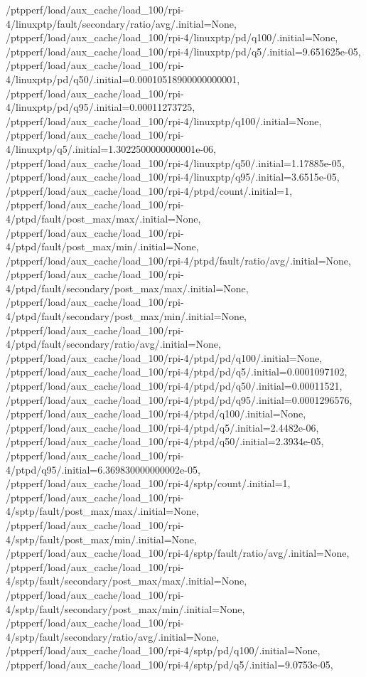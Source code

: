 {    /ptpperf/load/aux_cache/load_100/rpi-4/linuxptp/fault/secondary/ratio/avg/.initial=None,
    /ptpperf/load/aux_cache/load_100/rpi-4/linuxptp/pd/q100/.initial=None,
    /ptpperf/load/aux_cache/load_100/rpi-4/linuxptp/pd/q5/.initial=9.651625e-05,
    /ptpperf/load/aux_cache/load_100/rpi-4/linuxptp/pd/q50/.initial=0.00010518900000000001,
    /ptpperf/load/aux_cache/load_100/rpi-4/linuxptp/pd/q95/.initial=0.00011273725,
    /ptpperf/load/aux_cache/load_100/rpi-4/linuxptp/q100/.initial=None,
    /ptpperf/load/aux_cache/load_100/rpi-4/linuxptp/q5/.initial=1.3022500000000001e-06,
    /ptpperf/load/aux_cache/load_100/rpi-4/linuxptp/q50/.initial=1.17885e-05,
    /ptpperf/load/aux_cache/load_100/rpi-4/linuxptp/q95/.initial=3.6515e-05,
    /ptpperf/load/aux_cache/load_100/rpi-4/ptpd/count/.initial=1,
    /ptpperf/load/aux_cache/load_100/rpi-4/ptpd/fault/post_max/max/.initial=None,
    /ptpperf/load/aux_cache/load_100/rpi-4/ptpd/fault/post_max/min/.initial=None,
    /ptpperf/load/aux_cache/load_100/rpi-4/ptpd/fault/ratio/avg/.initial=None,
    /ptpperf/load/aux_cache/load_100/rpi-4/ptpd/fault/secondary/post_max/max/.initial=None,
    /ptpperf/load/aux_cache/load_100/rpi-4/ptpd/fault/secondary/post_max/min/.initial=None,
    /ptpperf/load/aux_cache/load_100/rpi-4/ptpd/fault/secondary/ratio/avg/.initial=None,
    /ptpperf/load/aux_cache/load_100/rpi-4/ptpd/pd/q100/.initial=None,
    /ptpperf/load/aux_cache/load_100/rpi-4/ptpd/pd/q5/.initial=0.0001097102,
    /ptpperf/load/aux_cache/load_100/rpi-4/ptpd/pd/q50/.initial=0.00011521,
    /ptpperf/load/aux_cache/load_100/rpi-4/ptpd/pd/q95/.initial=0.0001296576,
    /ptpperf/load/aux_cache/load_100/rpi-4/ptpd/q100/.initial=None,
    /ptpperf/load/aux_cache/load_100/rpi-4/ptpd/q5/.initial=2.4482e-06,
    /ptpperf/load/aux_cache/load_100/rpi-4/ptpd/q50/.initial=2.3934e-05,
    /ptpperf/load/aux_cache/load_100/rpi-4/ptpd/q95/.initial=6.369830000000002e-05,
    /ptpperf/load/aux_cache/load_100/rpi-4/sptp/count/.initial=1,
    /ptpperf/load/aux_cache/load_100/rpi-4/sptp/fault/post_max/max/.initial=None,
    /ptpperf/load/aux_cache/load_100/rpi-4/sptp/fault/post_max/min/.initial=None,
    /ptpperf/load/aux_cache/load_100/rpi-4/sptp/fault/ratio/avg/.initial=None,
    /ptpperf/load/aux_cache/load_100/rpi-4/sptp/fault/secondary/post_max/max/.initial=None,
    /ptpperf/load/aux_cache/load_100/rpi-4/sptp/fault/secondary/post_max/min/.initial=None,
    /ptpperf/load/aux_cache/load_100/rpi-4/sptp/fault/secondary/ratio/avg/.initial=None,
    /ptpperf/load/aux_cache/load_100/rpi-4/sptp/pd/q100/.initial=None,
    /ptpperf/load/aux_cache/load_100/rpi-4/sptp/pd/q5/.initial=9.0753e-05,
}

